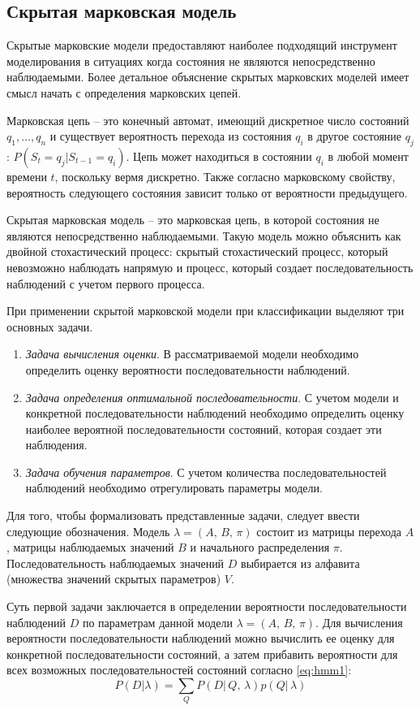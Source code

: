 \subsection{Скрытая марковская модель}

Скрытые марковские модели предоставляют наиболее подходящий инструмент моделирования в ситуациях когда состояния не являются непосредственно наблюдаемыми. Более детальное объяснение скрытых марковских моделей имеет смысл начать с определения марковских цепей.

Марковская цепь -- это конечный автомат, имеющий дискретное число состояний $q_1, \dots, q_n$ и существует вероятность перехода из состояния $q_i$ в другое состояние $q_j$: $P\left(S_t = q_j | S_{t - 1} = q_i\right)$. Цепь может находиться в состоянии $q_i$ в любой момент времени $t$, поскольку вермя дискретно. Также согласно марковскому свойству, вероятность следующего состояния зависит только от вероятности предыдущего.

Скрытая марковская модель -- это марковская цепь, в которой состояния не являются непосредственно наблюдаемыми. Такую модель можно объяснить как двойной  стохастический процесс: скрытый стохастический процесс, который невозможно наблюдать напрямую и процесс, который создает последовательность наблюдений с учетом первого процесса.

При применении скрытой марковской модели при классификации выделяют три основных задачи. 
\begin{enumerate}
	\item \textit{Задача вычисления оценки}. В рассматриваемой модели необходимо определить оценку вероятности последовательности наблюдений.
	\item \textit{Задача определения оптимальной последовательности}. С учетом модели и конкретной последовательности наблюдений необходимо определить оценку наиболее вероятной последовательности состояний, которая создает эти 	наблюдения.
	\item \textit{Задача обучения параметров}. С учетом количества последовательностей наблюдений необходимо отрегулировать параметры модели.
\end{enumerate}
Для того, чтобы формализовать представленные задачи, следует ввести следующие обозначения. Модель $\lambda = (A,\,B,\,\pi)$ состоит из матрицы перехода $A$, матрицы наблюдаемых значений $B$ и начального распределения $\pi$. Последовательность наблюдаемых значений $D$ выбирается из алфавита (множества значений скрытых параметров) $V$.

Суть первой задачи заключается в определении вероятности последовательности наблюдений $D$ по параметрам данной модели $\lambda = (A,\,B,\,\pi)$. Для вычисления вероятности последовательности наблюдений можно вычислить ее оценку для конкретной последовательности состояний, а затем прибавить вероятности для всех возможных последовательностей состояний согласно \ref{eq:hmm1}:
\begin{equation}\label{eq:hmm1}
	P(D|\lambda) = \sum_{Q}P(D|\,Q,\,\lambda)p(Q|\,\lambda)
\end{equation}

